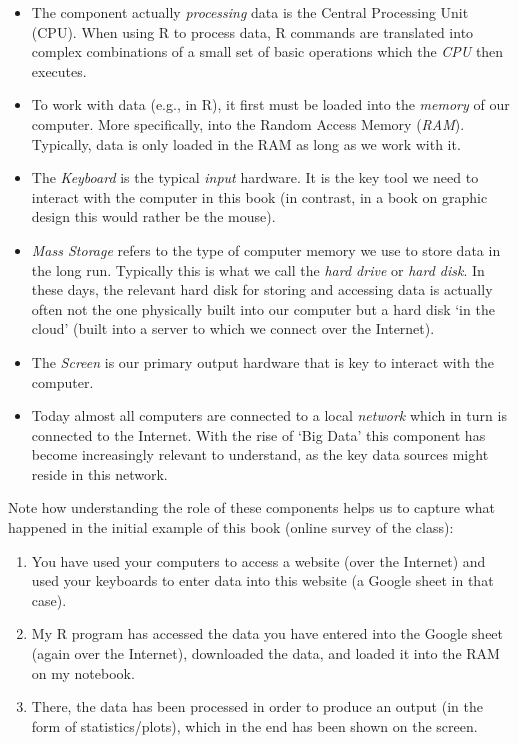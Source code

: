 \documentclass[
  12pt,
]{style/krantz}
\begin{document}
\begin{itemize}
\item
  The component actually \emph{processing} data is the Central Processing Unit (CPU). When using R to process data, R commands are translated into complex combinations of a small set of basic operations which the \emph{CPU} then executes.
\item
  To work with data (e.g., in R), it first must be loaded into the \emph{memory} of our computer. More specifically, into the Random Access Memory (\emph{RAM}). Typically, data is only loaded in the RAM as long as we work with it.
\item
  The \emph{Keyboard} is the typical \emph{input} hardware. It is the key tool we need to interact with the computer in this book (in contrast, in a book on graphic design this would rather be the mouse).
\item
  \emph{Mass Storage} refers to the type of computer memory we use to store data in the long run. Typically this is what we call the \emph{hard drive} or \emph{hard disk}. In these days, the relevant hard disk for storing and accessing data is actually often not the one physically built into our computer but a hard disk `in the cloud' (built into a server to which we connect over the Internet).
\item
  The \emph{Screen} is our primary output hardware that is key to interact with the computer.
\item
  Today almost all computers are connected to a local \emph{network} which in turn is connected to the Internet. With the rise of `Big Data' this component has become increasingly relevant to understand, as the key data sources might reside in this network.
\end{itemize}

Note how understanding the role of these components helps us to capture what happened in the initial example of this book (online survey of the class):

\begin{enumerate}
\def\labelenumi{\arabic{enumi}.}
\item
  You have used your computers to access a website (over the Internet) and used your keyboards to enter data into this website (a Google sheet in that case).
\item
  My R program has accessed the data you have entered into the Google sheet (again over the Internet), downloaded the data, and loaded it into the RAM on my notebook.
\item
  There, the data has been processed in order to produce an output (in the form of statistics/plots), which in the end has been shown on the screen.
\end{enumerate}
\end{document}
